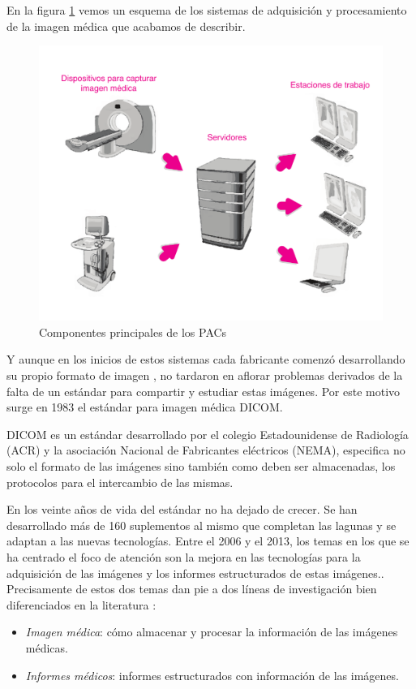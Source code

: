 En la figura \ref{fig:pacs} vemos un esquema de los sistemas de adquisición y procesamiento de la imagen médica que acabamos de describir.\par
\begin{figure}[ht]
\centering
\includegraphics[scale=0.6]{./imgs/esquemas/pacs.pdf}
\caption{Componentes principales de los PACs}
\label{fig:pacs}
\end{figure}

\medskip\par

Y aunque en los inicios de estos sistemas cada fabricante comenzó desarrollando su propio formato de imagen \cite{huang2011short, lemke2011short}, no tardaron en aflorar problemas derivados de la falta de un estándar para compartir y estudiar estas imágenes. Por este motivo surge en 1983 el estándar para imagen médica DICOM.\medskip\par

DICOM es un estándar \cite{bidgood1992introduction} desarrollado por el colegio Estadounidense de Radiología (ACR) y la asociación Nacional de Fabricantes eléctricos (NEMA), especifica no  solo el formato de las imágenes sino también como deben ser almacenadas, los protocolos para el intercambio de las mismas. \par
En los veinte años de vida del estándar no ha dejado de crecer. Se han desarrollado más de 160 suplementos al mismo que completan las lagunas y se adaptan a las nuevas tecnologías. Entre el 2006 y el 2013, los temas en los que se ha centrado el foco de atención son la mejora en las tecnologías para la adquisición de las imágenes y los informes estructurados de estas imágenes.\cite{dicomtrends}.
Precisamente de estos dos temas dan pie a dos líneas de investigación bien diferenciados en la literatura \cite{torres2012improving}:
\begin{itemize}
	\item \textit{Imagen médica}: cómo almacenar y procesar la información de las imágenes médicas. 
	\item \textit{Informes médicos}: informes estructurados con información de las imágenes.  
\end{itemize}
\medskip\par

